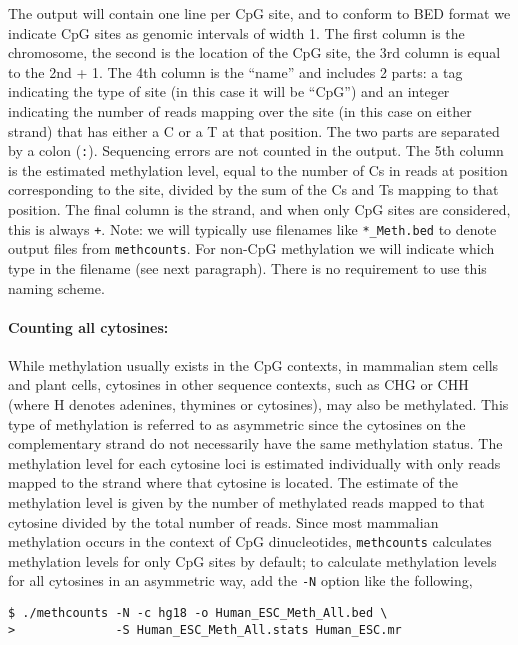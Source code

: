 \documentclass[10pt]{article}
\newcommand{\prog}[1]{\texttt{#1}}
\newcommand{\fn}[1]{\texttt{#1}}
\newcommand{\lit}[1]{\texttt{#1}}
\newcommand{\op}[1]{\texttt{#1}}
\begin{document}
The output will contain one line per CpG site, and to conform to BED
format we indicate CpG sites as genomic intervals of width 1. The
first column is the chromosome, the second is the location of the CpG
site, the 3rd column is equal to the 2nd + 1. The 4th column is the
``name'' and includes 2 parts: a tag indicating the type of site (in
this case it will be ``CpG'') and an integer indicating the number of
reads mapping over the site (in this case on either strand) that has
either a C or a T at that position. The two parts are separated by a
colon (\lit{:}). Sequencing errors are not counted in the output. The
5th column is the estimated methylation level, equal to the number of
Cs in reads at position corresponding to the site, divided by the sum
of the Cs and Ts mapping to that position. The final column is the
strand, and when only CpG sites are considered, this is always
\lit{+}. Note: we will typically use filenames like \fn{*\_Meth.bed} to
denote output files from \prog{methcounts}. For non-CpG methylation we
will indicate which type in the filename (see next paragraph). There
is no requirement to use this naming scheme.

\paragraph{Counting all cytosines:}
While methylation usually exists in the CpG contexts, in mammalian
stem cells and plant cells, cytosines in other sequence contexts, such
as CHG or CHH (where H denotes adenines, thymines or cytosines), may
also be methylated. This type of methylation is referred to as
asymmetric since the cytosines on the complementary strand do not
necessarily have the same methylation status. The methylation level
for each cytosine loci is estimated individually with only reads
mapped to the strand where that cytosine is located. The estimate of
the methylation level is given by the number of methylated reads
mapped to that cytosine divided by the total number of reads. Since
most mammalian methylation occurs in the context of CpG dinucleotides,
\prog{methcounts} calculates methylation levels for only CpG sites by
default; to calculate methylation levels for all cytosines in an
asymmetric way, add the \op{-N} option like the following,
\begin{verbatim}
$ ./methcounts -N -c hg18 -o Human_ESC_Meth_All.bed \
>              -S Human_ESC_Meth_All.stats Human_ESC.mr
\end{verbatim}
\end{document}
